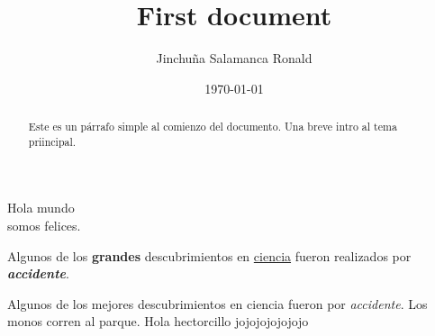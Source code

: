 \documentclass[12pt, letterpaper]{article}
\title{First document}
\author{Jinchuña Salamanca Ronald}
\date{\today}
\begin{document}
\begin{titlepage}
\maketitle
\end{titlepage}

\begin{abstract}
Este es un párrafo simple al comienzo del documento. Una breve intro al tema priincipal.
\end{abstract}

Hola mundo \\ somos felices.

Algunos de los \textbf{grandes}
descubrimientos en \underline{ciencia}
fueron realizados por \textbf{\textit{accidente}}.

Algunos de los mejores descubrimientos en ciencia fueron por \emph{accidente}.
Los monos corren al parque.
Hola hectorcillo jojojojojojojo
\end{document}
